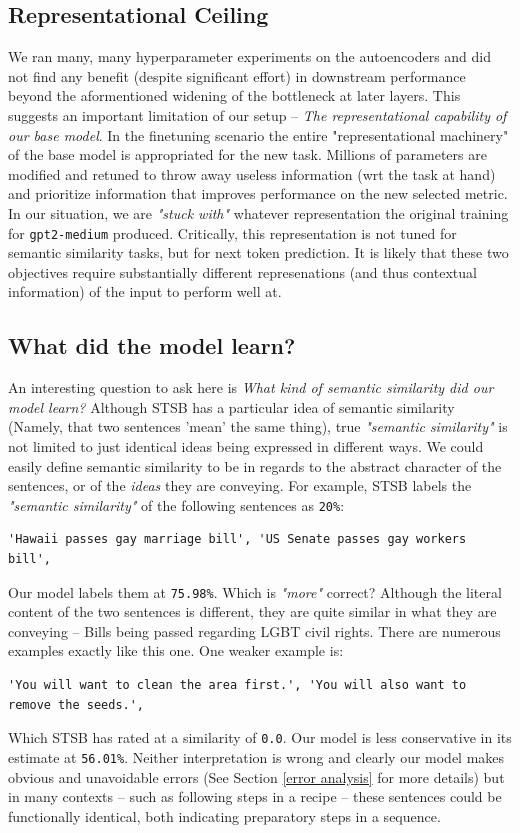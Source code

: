\documentclass[14pt]{article}
\begin{document}
\subsection{Representational Ceiling}
We ran many, many hyperparameter experiments on the autoencoders and did not find any benefit (despite significant effort) in downstream performance beyond the aformentioned widening of the bottleneck at later layers. This suggests an important limitation of our setup -- \textit{The representational capability of our base model}. In the finetuning scenario the entire "representational machinery" of the base model is appropriated for the new task. Millions of parameters are modified and retuned to throw away useless information (wrt the task at hand) and prioritize information that improves performance on the new selected metric. In our situation, we are \textit{"stuck with"} whatever representation the original training for \verb|gpt2-medium| produced. Critically, this representation is not tuned for semantic similarity tasks, but for next token prediction. It is likely that these two objectives require substantially different represenations (and thus contextual information) of the input to perform well at.

\subsection{What did the model learn?}
An interesting question to ask here is \textit{What kind of semantic similarity did our model learn?} Although STSB has a particular idea of semantic similarity (Namely, that two sentences 'mean' the same thing), true \textit{"semantic similarity"} is not limited to just identical ideas being expressed in different ways. We could easily define semantic similarity to be in regards to the abstract character of the sentences, or of the \textit{ideas} they are conveying. For example, STSB labels the \textit{"semantic similarity"} of the following sentences as \verb|20%|:
\begin{verbatim}
'Hawaii passes gay marriage bill', 'US Senate passes gay workers bill',
\end{verbatim}
Our model labels them at \verb|75.98%|. Which is \textit{"more"} correct? Although the literal content of the two sentences is different, they are quite similar in what they are conveying -- Bills being passed regarding LGBT civil rights. There are numerous examples exactly like this one. One weaker example is:
\begin{verbatim}
'You will want to clean the area first.', 'You will also want to remove the seeds.',
\end{verbatim}
Which STSB has rated at a similarity of \verb|0.0|. Our model is less conservative in its estimate at \verb|56.01%|. Neither interpretation is wrong and clearly our model makes obvious and unavoidable errors (See Section \ref{error analysis} for more details) but in many contexts -- such as following steps in a recipe -- these sentences could be functionally identical, both indicating preparatory steps in a sequence.
\end{document}
